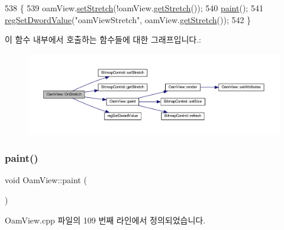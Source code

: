 \begin{DoxyCode}
538 \{
539   oamView.\mbox{\hyperlink{class_bitmap_control_ab545e15ea3edda9f0d80c0b8b0b7c812}{setStretch}}(!oamView.\mbox{\hyperlink{class_bitmap_control_a1d3cff9a3b57dd7558d678177dcf4b5c}{getStretch}}());
540   \mbox{\hyperlink{class_oam_view_af9092e04b559ef87670e18dd42c45669}{paint}}();
541   \mbox{\hyperlink{_reg_8cpp_a758e775489a3fb5c3cc7071fdd5af87e}{regSetDwordValue}}(\textcolor{stringliteral}{"oamViewStretch"}, oamView.\mbox{\hyperlink{class_bitmap_control_a1d3cff9a3b57dd7558d678177dcf4b5c}{getStretch}}());  
542 \}
\end{DoxyCode}
이 함수 내부에서 호출하는 함수들에 대한 그래프입니다.\+:
\nopagebreak
\begin{figure}[H]
\begin{center}
\leavevmode
\includegraphics[width=350pt]{class_oam_view_a60c3ddf70e740451daa8bb8a76661667_cgraph}
\end{center}
\end{figure}
\mbox{\label{class_oam_view_af9092e04b559ef87670e18dd42c45669}} 
\subsubsection{\texorpdfstring{paint()}{paint()}}
{\footnotesize\ttfamily void Oam\+View\+::paint (\begin{DoxyParamCaption}{ }\end{DoxyParamCaption})}



Oam\+View.\+cpp 파일의 109 번째 라인에서 정의되었습니다.


